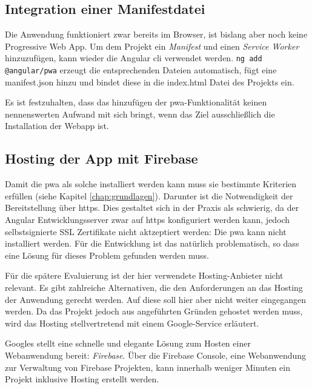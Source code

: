 \subsection{Integration einer Manifestdatei}

Die Anwendung funktioniert zwar bereits im Browser, ist bislang aber noch keine Progressive Web App. Um dem Projekt ein \textit{Manifest} und einen \textit{Service Worker} hinzuzufügen, kann wieder die Angular \ac{cli} verwendet werden. \texttt{ng add @angular/pwa} erzeugt die entsprechenden Dateien automatisch, fügt eine manifest.json hinzu und bindet diese in die index.html Datei des Projekts ein.

Es ist festzuhalten, dass das hinzufügen der \ac{pwa}-Funktionalität keinen nennenswerten Aufwand mit sich bringt, wenn das Ziel ausschließlich die Installation der Webapp ist.

\subsection{Hosting der App mit Firebase}
Damit die \ac{pwa} als solche installiert werden kann muss sie bestimmte Kriterien erfüllen (siehe Kapitel \ref{chap:grundlagen}). Darunter ist die Notwendigkeit der Bereitstellung über \ac{https}. Dies gestaltet sich in der Praxis als schwierig, da der Angular Entwicklungsserver zwar auf \ac{https} konfiguriert werden kann, jedoch selbstsignierte SSL Zertifikate nicht aktzeptiert werden: Die \ac{pwa} kann nicht installiert werden. Für die Entwicklung ist das natürlich problematisch, so dass eine Lösung für dieses Problem gefunden werden muss.

Für die spätere Evaluierung ist der hier verwendete Hosting-Anbieter nicht relevant. Es gibt zahlreiche Alternativen, die den Anforderungen an das Hosting der Anwendung gerecht werden. Auf diese soll hier aber nicht weiter eingegangen werden. Da das Projekt jedoch aus angeführten Gründen gehostet werden muss, wird das Hosting stellvertretend mit einem Google-Service erläutert.

Googles stellt eine schnelle und elegante Lösung zum Hosten einer Webanwendung bereit: \textit{Firebase}. Über die Firebase Console, eine Webanwendung zur Verwaltung von Firebase Projekten, kann innerhalb weniger Minuten ein Projekt inklusive Hosting erstellt werden. 




